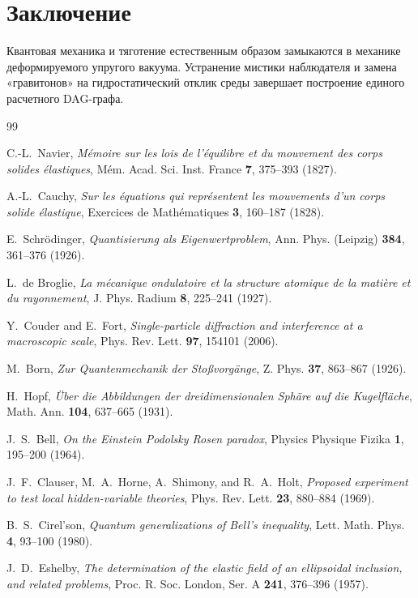 \documentclass[11pt,a4paper]{article}
\theoremstyle{definition}
\theoremstyle{remark}
\begin{document}
\section{Заключение}
Квантовая механика и тяготение естественным образом замыкаются в механике деформируемого упругого вакуума. Устранение мистики наблюдателя и замена «гравитонов» на гидростатический отклик среды завершает построение единого расчетного DAG-графа.

\begin{thebibliography}{99}

C.-L.~Navier, \textit{M{\'e}moire sur les lois de l'{\'e}quilibre et du mouvement des corps solides {\'e}lastiques}, M{\'e}m. Acad. Sci. Inst. France \textbf{7}, 375--393 (1827).

A.-L.~Cauchy, \textit{Sur les {\'e}quations qui repr{\'e}sentent les mouvements d'un corps solide {\'e}lastique}, Exercices de Math{\'e}matiques \textbf{3}, 160--187 (1828).

E.~Schr{\"o}dinger, \textit{Quantisierung als Eigenwertproblem}, Ann. Phys. (Leipzig) \textbf{384}, 361--376 (1926).

L.~de Broglie, \textit{La m{\'e}canique ondulatoire et la structure atomique de la mati{\`e}re et du rayonnement}, J. Phys. Radium \textbf{8}, 225--241 (1927).

Y.~Couder and E.~Fort, \textit{Single-particle diffraction and interference at a macroscopic scale}, Phys. Rev. Lett. \textbf{97}, 154101 (2006).

M.~Born, \textit{Zur Quantenmechanik der Sto{\ss}vorg{\"a}nge}, Z. Phys. \textbf{37}, 863--867 (1926).

H.~Hopf, \textit{{\"U}ber die Abbildungen der dreidimensionalen Sph{\"a}re auf die Kugelfl{\"a}che}, Math. Ann. \textbf{104}, 637--665 (1931).

J.~S.~Bell, \textit{On the Einstein Podolsky Rosen paradox}, Physics Physique Fizika \textbf{1}, 195--200 (1964).

J.~F.~Clauser, M.~A.~Horne, A.~Shimony, and R.~A.~Holt, \textit{Proposed experiment to test local hidden-variable theories}, Phys. Rev. Lett. \textbf{23}, 880--884 (1969).

B.~S.~Cirel'son, \textit{Quantum generalizations of Bell's inequality}, Lett. Math. Phys. \textbf{4}, 93--100 (1980).

J.~D.~Eshelby, \textit{The determination of the elastic field of an ellipsoidal inclusion, and related problems}, Proc. R. Soc. London, Ser. A \textbf{241}, 376--396 (1957).

\end{thebibliography}
\end{document}
